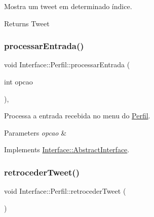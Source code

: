 Mostra um tweet em determinado índice. 

\begin{DoxyReturn}{Returns}
Tweet 
\end{DoxyReturn}
\mbox{\label{class_interface_1_1_perfil_a699f6dc5e49e072288f2fde2c220a0fc}} 
\subsubsection{\texorpdfstring{processar\+Entrada()}{processarEntrada()}}
{\footnotesize\ttfamily void Interface\+::\+Perfil\+::processar\+Entrada (\begin{DoxyParamCaption}\item[{int}]{opcao }\end{DoxyParamCaption})\hspace{0.3cm}{\ttfamily [override]}, {\ttfamily [virtual]}}



Processa a entrada recebida no menu do \hyperlink{class_interface_1_1_perfil}{Perfil}. 


\begin{DoxyParams}{Parameters}
{\em opcao} & \\
\hline
\end{DoxyParams}


Implements \hyperlink{class_interface_1_1_abstract_interface_a9318f98f907ce54ef2dbf892ba327da2}{Interface\+::\+Abstract\+Interface}.

\mbox{\label{class_interface_1_1_perfil_aa7e1fbff4eb1c95c13f91b3a0ec84a42}} 
\subsubsection{\texorpdfstring{retroceder\+Tweet()}{retrocederTweet()}}
{\footnotesize\ttfamily void Interface\+::\+Perfil\+::retroceder\+Tweet (\begin{DoxyParamCaption}{ }\end{DoxyParamCaption})\hspace{0.3cm}{\ttfamily [private]}}



